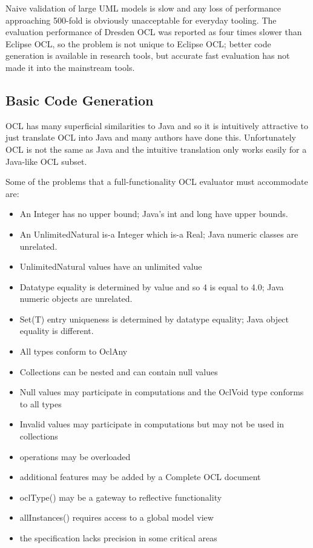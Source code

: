 \documentclass{acm_proc_article-sp}
\begin{document}
Naive validation of large UML models is slow and any loss of performance approaching 500-fold is
obviously unacceptable for everyday tooling. The evaluation performance of Dresden OCL was reported as four times slower than Eclipse OCL, so the problem is not unique to Eclipse OCL; better code generation  is available in research tools, but
accurate fast evaluation has not made it into the mainstream tools.

\subsection{Basic Code Generation}

OCL has many superficial similarities to Java and so it is intuitively attractive to just translate OCL into Java and many authors have done this. Unfortunately OCL is not the same as Java and the intuitive translation only works easily for a Java-like OCL subset.

Some of the problems that a full-functionality OCL evaluator must accommodate are:
\begin{itemize}
\item An Integer has no upper bound; Java's int and long have upper bounds.
\item An UnlimitedNatural is-a Integer which is-a Real; Java numeric classes are unrelated.
\item UnlimitedNatural values have an unlimited value
\item Datatype equality is determined by value and so 4 is equal to 4.0; Java numeric objects are unrelated.
\item Set(T) entry uniqueness is determined by datatype equality; Java object equality is different.
\item All types conform to OclAny
\item Collections can be nested and can contain null values
\item Null values may participate in computations and the OclVoid type conforms to all types
\item Invalid values may participate in computations but may not be used in collections
\item operations may be overloaded
\item additional features may be added by a Complete OCL document
\item oclType() may be a gateway to reflective functionality
\item allInstances() requires access to a global model view 
\item the specification lacks precision in some critical areas
\end{itemize}
\end{document}
